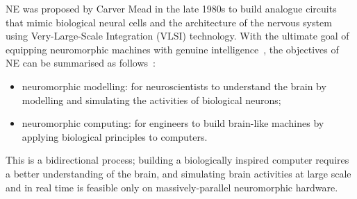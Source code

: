 NE was proposed by Carver Mead in the late 1980s \citep{Mead:1989:AVN:64998} to build analogue circuits that mimic biological neural cells and the architecture of the nervous system using Very-Large-Scale Integration (VLSI) technology.
With the ultimate goal of equipping neuromorphic machines with genuine intelligence~\citep{konar1999artificial}, the objectives of NE can be summarised as follows~\citep{furber2007neural}:
\begin{itemize}
	\item neuromorphic modelling: for neuroscientists to understand the brain by modelling and simulating the activities of biological neurons; 
	\item neuromorphic computing: for engineers to build brain-like machines by applying biological principles to computers.
\end{itemize}
This is a bidirectional process; building a biologically inspired computer requires a better understanding of the brain, and simulating brain activities at large scale and in real time is feasible only on massively-parallel neuromorphic hardware.


